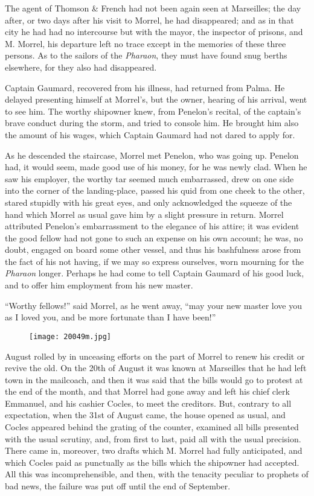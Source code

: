 The agent of Thomson \& French had not been again seen at Marseilles;
the day after, or two days after his visit to Morrel, he had
disappeared; and as in that city he had had no intercourse but with the
mayor, the inspector of prisons, and M. Morrel, his departure left no
trace except in the memories of these three persons. As to the sailors
of the \textit{Pharaon}, they must have found snug berths elsewhere, for they
also had disappeared.

Captain Gaumard, recovered from his illness, had returned from Palma.
He delayed presenting himself at Morrel’s, but the owner, hearing of
his arrival, went to see him. The worthy shipowner knew, from Penelon’s
recital, of the captain’s brave conduct during the storm, and tried to
console him. He brought him also the amount of his wages, which Captain
Gaumard had not dared to apply for.

As he descended the staircase, Morrel met Penelon, who was going up.
Penelon had, it would seem, made good use of his money, for he was
newly clad. When he saw his employer, the worthy tar seemed much
embarrassed, drew on one side into the corner of the landing-place,
passed his quid from one cheek to the other, stared stupidly with his
great eyes, and only acknowledged the squeeze of the hand which Morrel
as usual gave him by a slight pressure in return. Morrel attributed
Penelon’s embarrassment to the elegance of his attire; it was evident
the good fellow had not gone to such an expense on his own account; he
was, no doubt, engaged on board some other vessel, and thus his
bashfulness arose from the fact of his not having, if we may so express
ourselves, worn mourning for the \textit{Pharaon} longer. Perhaps he had come
to tell Captain Gaumard of his good luck, and to offer him employment
from his new master.

“Worthy fellows!” said Morrel,  as he went away, “may your new master
love you as I loved you, and be more fortunate than I have been!”

\begin{figure}[ht]
\texttt{[image: 20049m.jpg]}
\end{figure}

August rolled by in unceasing efforts on the part of Morrel to renew
his credit or revive the old. On the 20th of August it was known at
Marseilles that he had left town in the mailcoach, and then it was said
that the bills would go to protest at the end of the month, and that
Morrel had gone away and left his chief clerk Emmanuel, and his cashier
Cocles, to meet the creditors. But, contrary to all expectation, when
the 31st of August came, the house opened as usual, and Cocles appeared
behind the grating of the counter, examined all bills presented with
the usual scrutiny, and, from first to last, paid all with the usual
precision. There came in, moreover, two drafts which M. Morrel had
fully anticipated, and which Cocles paid as punctually as the bills
which the shipowner had accepted. All this was incomprehensible, and
then, with the tenacity peculiar to prophets of bad news, the failure
was put off until the end of September.

